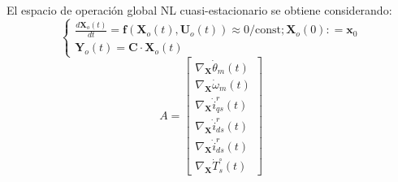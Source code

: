 \documentclass[a4paper, 10pt, onecolumn,journal]{ieeeconf}
\newcommand{\defeq}{\mathrel{\mathop:}=}
\begin{document}
El espacio de operación global NL cuasi-estacionario se obtiene considerando:
\[
\begin{cases}
\frac{d\mathbf{X}_o(t)}{dt} = \mathbf{f}(\mathbf{X}_o(t), \mathbf{U}_o(t)) \approx 0/\text{const};  \mathbf{X}_o(0) \defeq \mathbf{x}_0 \\
\mathbf{Y}_o(t) = \mathbf{C} \cdot \mathbf{X}_o(t)
\end{cases}
\]
\begin{equation}
    A = \begin{bmatrix}
        \nabla_{\mathbf{X}} \dot{\theta}_m(t) \\ 
        \nabla_{\mathbf{X}} \dot{\omega}_m(t) \\
        \nabla_{\mathbf{X}} \dot{i}^r_{qs}(t) \\ 
        \nabla_{\mathbf{X}} \dot{i}^r_{ds}(t) \\ 
        \nabla_{\mathbf{X}} \dot{i}^r_{ds}(t) \\ 
        \nabla_{\mathbf{X}} \dot{T}^\circ_s(t) 
        \end{bmatrix}
    \label{eq:matriz_A}
\end{equation}
\end{document}
